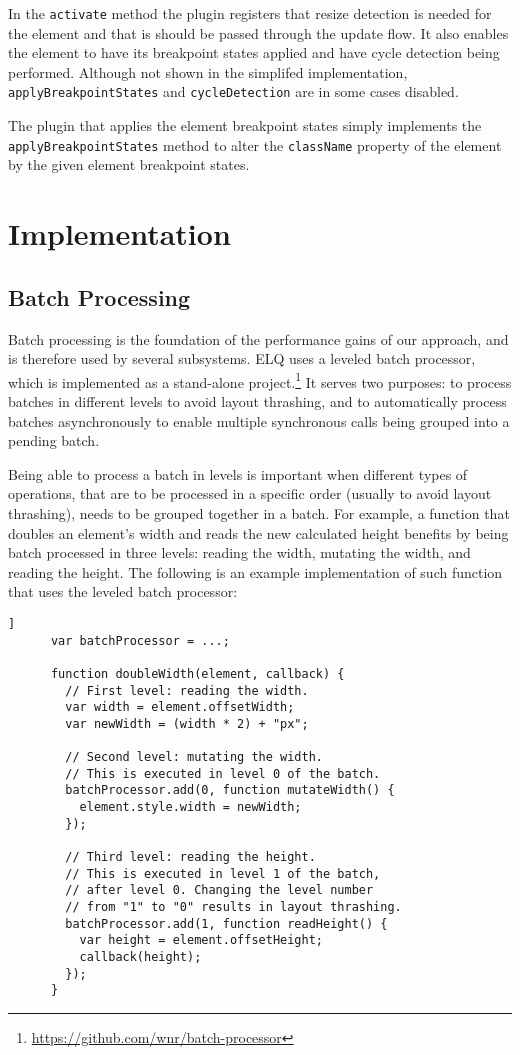 \documentclass{acm_proc_article-sp}
\newcommand{\code}[1]{\texttt{#1}}
\newcommand{\elq}{ELQ}
\begin{document}
    In the \code{activate} method the plugin registers that resize detection is needed for the element and that is should be passed through the update flow.
    It also enables the element to have its breakpoint states applied and have cycle detection being performed.
    Although not shown in the simplifed implementation, \code{applyBreakpointStates} and \code{cycleDetection} are in some cases disabled.

    The plugin that applies the element breakpoint states simply implements the \code{applyBreakpointStates} method to alter the \code{className} property of the element by the given element breakpoint states.

\section{Implementation}\label{sec:imp}
  \subsection{Batch Processing}\label{sec:imp_batch_processor}
    Batch processing is the foundation of the performance gains of our approach, and is therefore used by several subsystems.
    \elq{} uses a leveled batch processor, which is implemented as a stand-alone project.\footnote{\url{https://github.com/wnr/batch-processor}}
    It serves two purposes: to process batches in different levels to avoid layout thrashing, and to automatically process batches asynchronously to enable multiple synchronous calls being grouped into a pending batch.

    Being able to process a batch in levels is important when different types of operations, that are to be processed in a specific order (usually to avoid layout thrashing), needs to be grouped together in a batch.
    For example, a function that doubles an element's width and reads the new calculated height benefits by being batch processed in three levels: reading the width, mutating the width, and reading the height.
    The following is an example implementation of such function that uses the leveled batch processor:

    \begin{lstlisting}[gobble=6,label={},caption={},captionpos=b]]
      var batchProcessor = ...;

      function doubleWidth(element, callback) {
        // First level: reading the width.
        var width = element.offsetWidth;
        var newWidth = (width * 2) + "px";

        // Second level: mutating the width.
        // This is executed in level 0 of the batch.
        batchProcessor.add(0, function mutateWidth() {
          element.style.width = newWidth;
        });

        // Third level: reading the height.
        // This is executed in level 1 of the batch,
        // after level 0. Changing the level number 
        // from "1" to "0" results in layout thrashing.
        batchProcessor.add(1, function readHeight() {
          var height = element.offsetHeight;
          callback(height);
        });
      }
    \end{lstlisting}
\end{document}
